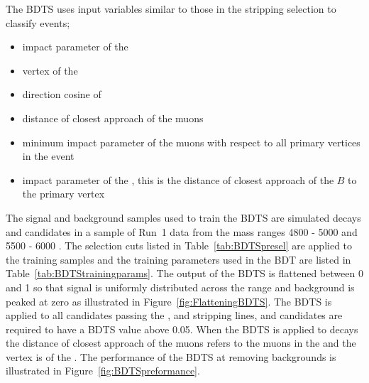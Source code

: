 The BDTS uses input variables similar to those in the stripping selection to classify events;
\begin{itemize}
\item impact parameter \chisqd of the \bs
\item vertex \chisqd of the \bs
\item direction cosine of \bs
\item distance of closest approach of the muons
\item minimum impact parameter \chisqd of the muons with respect to all primary vertices in the event
\item impact parameter of the \bs, this is the distance of closest approach of the $B$ to the primary vertex
\end{itemize}
The signal and background samples used to train the BDTS are simulated \bsmumu decays and \bsmumu candidates in a sample of Run~1 data from the mass ranges 4800 - 5000 \mevcc and 5500 - 6000 \mevcc. The selection cuts listed in Table~\ref{tab:BDTSpresel} are applied to the training samples and the training parameters used in the BDT are listed in Table~\ref{tab:BDTStrainingparams}. The output of the BDTS is flattened between 0 and 1 so that signal is uniformly distributed across the range and background is peaked at zero as illustrated in Figure~\ref{fig:FlatteningBDTS}. The BDTS is applied to all candidates passing the \bmumum, \bhh and \bujpsik stripping lines, and candidates are required to have a BDTS value above 0.05. When the BDTS is applied to \bujpsik decays the distance of closest approach of the muons refers to the muons in the \jpsi and the vertex \chisq is of the \jpsi. %
The performance of the BDTS at removing backgrounds is illustrated in Figure~\ref{fig:BDTSpreformance}. %

